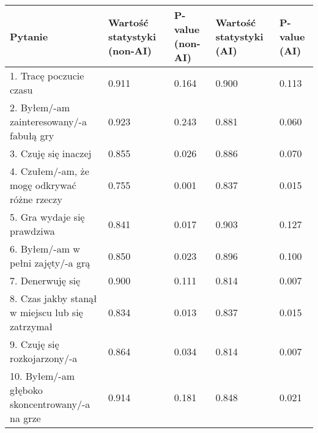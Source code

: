 \begin{table}[h!]
    \begin{center}
        \begin{tabular}{|m{10em}|m{5em}|m{5em}|m{5em}|m{5em}|}
            \hline
            Pytanie                                                           & Wartość statystyki (non-AI) & P-value (non-AI) & Wartość statystyki (AI) & P-value (AI) \\
            \hline
            1. Tracę poczucie czasu                                           & 0.911                       & 0.164            & 0.900                   & 0.113        \\
            2. Byłem/-am \newline zainteresowany/-a fabułą gry                & 0.923                       & 0.243            & 0.881                   & 0.060        \\
            3. Czuję się inaczej                                              & 0.855                       & 0.026            & 0.886                   & 0.070        \\
            4. Czułem/-am, że mogę odkrywać różne rzeczy                      & 0.755                       & 0.001            & 0.837                   & 0.015        \\
            5. Gra wydaje się prawdziwa                                       & 0.841                       & 0.017            & 0.903                   & 0.127        \\
            6. Byłem/-am \newline w pełni zajęty/-a grą                       & 0.850                       & 0.023            & 0.896                   & 0.100        \\
            7. Denerwuję się                                                  & 0.900                       & 0.111            & 0.814                   & 0.007        \\
            8. Czas jakby stanął w miejscu lub się zatrzymał                  & 0.834                       & 0.013            & 0.837                   & 0.015        \\
            9. Czuję się \newline rozkojarzony/-a                             & 0.864                       & 0.034            & 0.814                   & 0.007        \\
            10. Byłem/-am głęboko \newline skoncentrowany/-a \newline na grze & 0.914                       & 0.181            & 0.848                   & 0.021        \\

\end{tabular}
\end{center}
\end{table}

